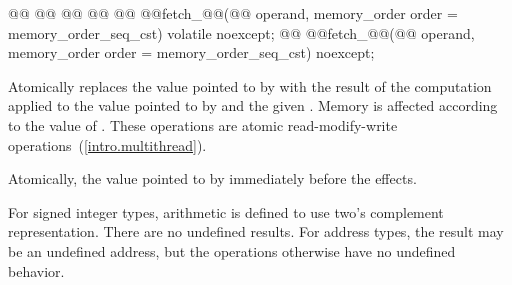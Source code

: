 %
%
%
%
%
%
%
%
%
%
%
%
%
%
%
%
%
\begin{itemdecl}
@@
@@
@@
@@
@@ @@fetch_@@(@@ operand, memory_order order = memory_order_seq_cst) volatile noexcept;
@@ @@fetch_@@(@@ operand, memory_order order = memory_order_seq_cst) noexcept;
\end{itemdecl}

\begin{itemdescr}
\pnum
\effects Atomically replaces the value pointed to  by
 with the result of the computation applied to the
value pointed to  by  and the given .
Memory is affected according to the value of .
These operations are atomic read-modify-write operations~(\ref{intro.multithread}).

\pnum
\returns Atomically, the value pointed to  by  immediately before the effects.

\pnum
{}%
\remarks For signed integer types, arithmetic is defined to use two's complement
representation. There are no undefined results. For address types, the result may be an
undefined address, but the operations otherwise have no undefined behavior.
\end{itemdescr}

